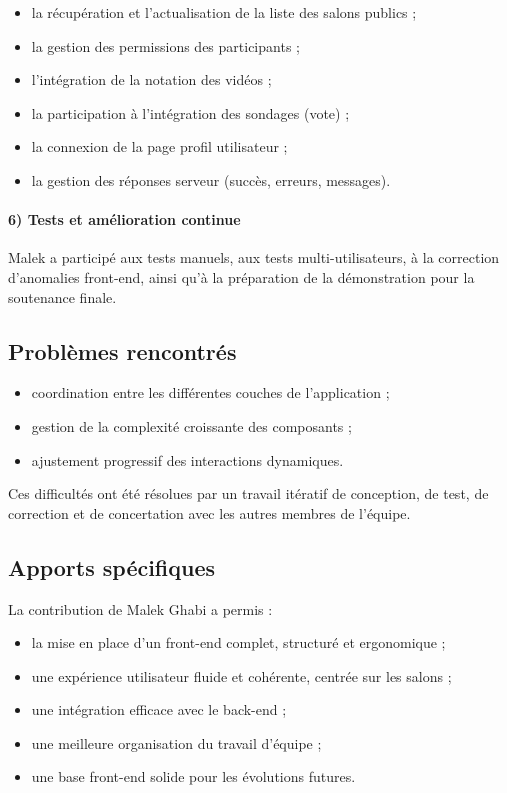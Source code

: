 \documentclass[12pt,a4paper]{report}
\begin{document}
\begin{itemize}
  \item la récupération et l’actualisation de la liste des salons publics ;
  \item la gestion des permissions des participants ;
  \item l’intégration de la notation des vidéos ;
  \item la participation à l’intégration des sondages (vote) ;
  \item la connexion de la page profil utilisateur ;
  \item la gestion des réponses serveur (succès, erreurs, messages).
\end{itemize}

\paragraph{6) Tests et amélioration continue}
Malek a participé aux tests manuels, aux tests multi-utilisateurs, à la correction d’anomalies front-end, ainsi qu’à la préparation de la démonstration pour la soutenance finale.

\subsection*{Problèmes rencontrés}

\begin{itemize}
  \item coordination entre les différentes couches de l’application ;
  \item gestion de la complexité croissante des composants ;
  \item ajustement progressif des interactions dynamiques.
\end{itemize}

Ces difficultés ont été résolues par un travail itératif de conception, de test, de correction et de concertation avec les autres membres de l’équipe.

\subsection*{Apports spécifiques}

La contribution de Malek Ghabi a permis :

\begin{itemize}
  \item la mise en place d’un front-end complet, structuré et ergonomique ;
  \item une expérience utilisateur fluide et cohérente, centrée sur les salons ;
  \item une intégration efficace avec le back-end ;
  \item une meilleure organisation du travail d’équipe ;
  \item une base front-end solide pour les évolutions futures.
\end{itemize}
\end{document}
